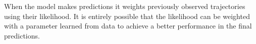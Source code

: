 When the model makes predictions it weights previously observed trajectories using their likelihood. It is entirely possible that the likelihood can be weighted with a parameter learned from data to achieve a better performance in the final predictions.


